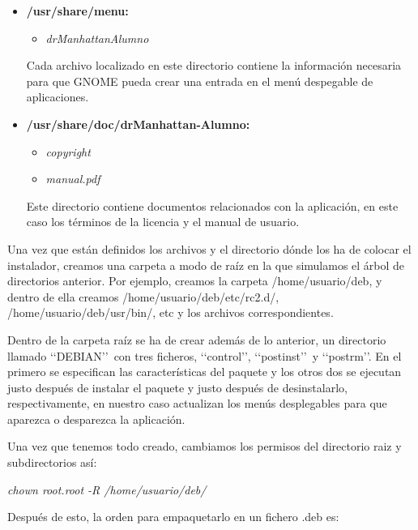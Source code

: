 \begin{itemize}
    \item {\bfseries /usr/share/menu:}
        \begin{itemize}
            \item \emph{drManhattanAlumno}
        \end{itemize}

    Cada archivo localizado en este directorio contiene la información necesaria para que GNOME pueda crear una entrada en el menú despegable de aplicaciones.


    \item {\bfseries /usr/share/doc/drManhattan-Alumno:}
        \begin{itemize}
            \item \emph{copyright}
            \item \emph{manual.pdf}
        \end{itemize}

    Este directorio contiene documentos relacionados con la aplicación, en este caso los términos de la licencia y el manual de usuario.
\end{itemize}



Una vez que están definidos los archivos y el directorio dónde los ha de colocar el instalador, creamos una carpeta a modo de raíz en la que simulamos el árbol de directorios anterior. Por ejemplo, creamos la carpeta /home/usuario/deb, y dentro de ella creamos /home/usuario/deb/etc/rc2.d/, /home/usuario/deb/usr/bin/, etc y los archivos correspondientes.
\newline

Dentro de la carpeta raíz se ha de crear además de lo anterior, un directorio llamado \lq\lq DEBIAN\rq \rq \ con tres ficheros, \lq\lq control\rq \rq, \lq\lq postinst\rq \rq \ y \lq\lq postrm\rq \rq . En el primero se especifican las características del paquete y los otros dos se ejecutan justo después de instalar el paquete y justo después de desinstalarlo, respectivamente, en nuestro caso actualizan los menús desplegables para que aparezca o desparezca la aplicación.
\newline

Una vez que tenemos todo creado, cambiamos los permisos del directorio raiz y subdirectorios así:

\begin{center}
    \emph{chown root.root -R /home/usuario/deb/}
\end{center}

Después de esto, la orden para empaquetarlo en un fichero .deb es:

